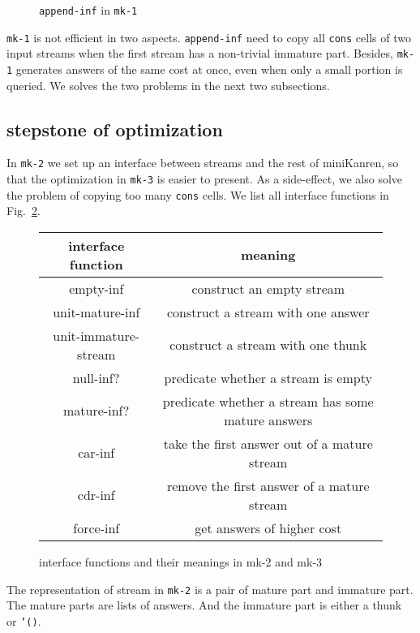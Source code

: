 \documentclass[format=acmlarge, review=true, authordraft=true]{acmart}
\begin{document}
\begin{figure}
	 	
	 \caption{\texttt{append-inf} in \texttt{mk-1}}
	 \label{append-inf-1}
\end{figure}

\texttt{mk-1} is not efficient in two aspects. \texttt{append-inf} need to copy all \texttt{cons} cells of two input streams when the first stream has a non-trivial immature part. Besides, \texttt{mk-1} generates answers of the same cost at once, even when only a small portion is queried. We solves the two problems in the next two subsections.

\subsection{stepstone of optimization}

In \texttt{mk-2} we set up an interface between streams and the rest of miniKanren,
so that the optimization in \texttt{mk-3} is easier to present. As a side-effect, we
also solve the problem of copying too many \texttt{cons} cells. We list all interface functions in Fig.~\ref{interface-functions}.

\begin{figure}

\begin{tabular}{|c|c|}
\hline 
interface function & meaning \\ 
\hline 
empty-inf & construct an empty stream \\ 
\hline 
unit-mature-inf & construct a stream with one answer \\ 
\hline 
unit-immature-stream & construct a stream with one thunk \\ 
\hline 
null-inf? & predicate whether a stream is empty \\ 
\hline 
mature-inf? & predicate whether a stream has some mature answers \\ 
\hline 
car-inf & take the first answer out of a mature stream \\ 
\hline 
cdr-inf & remove the first answer of a mature stream \\ 
\hline 
force-inf & get answers of higher cost \\ 
\hline
\end{tabular}
	 \caption{interface functions and their meanings in mk-2 and mk-3}
	 \label{interface-functions}
\end{figure} 

The representation of stream in \texttt{mk-2} is a pair of mature part and immature part. The mature parts are lists of answers. And the immature part is either a thunk or \texttt{'()}.
\end{document}
